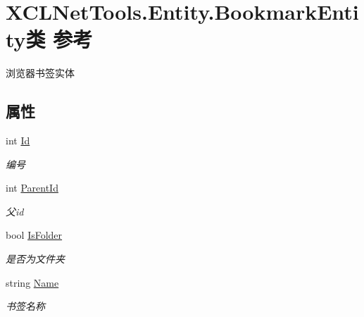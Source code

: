 \hypertarget{class_x_c_l_net_tools_1_1_entity_1_1_bookmark_entity}{}\section{X\+C\+L\+Net\+Tools.\+Entity.\+Bookmark\+Entity类 参考}
\label{class_x_c_l_net_tools_1_1_entity_1_1_bookmark_entity}


浏览器书签实体  


\subsection*{属性}
\begin{DoxyCompactItemize}
\item 
int \hyperlink{class_x_c_l_net_tools_1_1_entity_1_1_bookmark_entity_a827314c81aad0801f464f7359509baec}{Id}
\begin{DoxyCompactList}\small\item\em 编号 \end{DoxyCompactList}\item 
int \hyperlink{class_x_c_l_net_tools_1_1_entity_1_1_bookmark_entity_afd3c2002aa8d5edeac06f6ef32ba7454}{Parent\+Id}
\begin{DoxyCompactList}\small\item\em 父id \end{DoxyCompactList}\item 
bool \hyperlink{class_x_c_l_net_tools_1_1_entity_1_1_bookmark_entity_a025f1606c5b38103058567b3e08afe03}{Is\+Folder}
\begin{DoxyCompactList}\small\item\em 是否为文件夹 \end{DoxyCompactList}\item 
string \hyperlink{class_x_c_l_net_tools_1_1_entity_1_1_bookmark_entity_a89ccb517e285bfdd17981a72f590bc1c}{Name}
\begin{DoxyCompactList}\small\item\em 书签名称 \end{DoxyCompactList}\item 

\end{DoxyCompactItemize}
